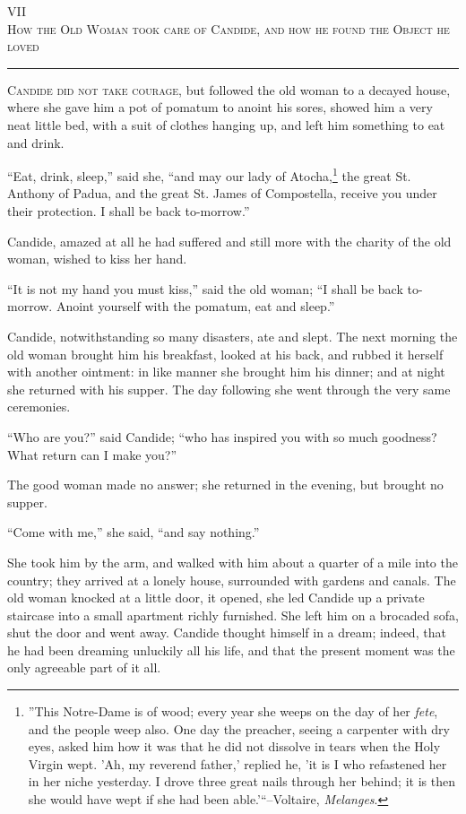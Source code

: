 \begin{center}
VII\\
\textsc{How the Old Woman took care of Candide, and how he found the Object he loved}
\end{center}
\vspace{-0.5cm}
\rule{\textwidth}{0.5pt}
\lettrine{C}{andide did not take courage}, but followed the old woman to a decayed house, where she gave him a pot of pomatum to anoint his sores, showed him a very neat little bed, with a suit of clothes hanging up, and left him something to eat and drink.

``Eat, drink, sleep,'' said she, ``and may our lady of Atocha,\footnote{''This Notre-Dame is of wood; every year she weeps on the day of her \textit{fete}, and the people weep also. One day the preacher, seeing a carpenter with dry eyes, asked him how it was that he did not dissolve in tears when the Holy Virgin wept. 'Ah, my reverend father,' replied he, 'it is I who refastened her in her niche yesterday. I drove three great nails through her behind; it is then she would have wept if she had been able.'``--Voltaire, \textit{Melanges}.} the great St. Anthony of Padua, and the great St. James of Compostella, receive you under their protection. I shall be back to-morrow.''

Candide, amazed at all he had suffered and still more with the charity of the old woman, wished to kiss her hand.

``It is not my hand you must kiss,'' said the old woman; ``I shall be back to-morrow. Anoint yourself with the pomatum, eat and sleep.''

Candide, notwithstanding so many disasters, ate and slept. The next morning the old woman brought him his breakfast, looked at his back, and rubbed it herself with another ointment: in like manner she brought him his dinner; and at night she returned with his supper. The day following she went through the very same ceremonies.

``Who are you?'' said Candide; ``who has inspired you with so much goodness? What return can I make you?''

The good woman made no answer; she returned in the evening, but brought no supper.

``Come with me,'' she said, ``and say nothing.''

She took him by the arm, and walked with him about a quarter of a mile into the country; they arrived at a lonely house, surrounded with gardens and canals. The old woman knocked at a little door, it opened, she led Candide up a private staircase into a small apartment richly furnished. She left him on a brocaded sofa, shut the door and went away. Candide thought himself in a dream; indeed, that he had been dreaming unluckily all his life, and that the present moment was the only agreeable part of it all.

